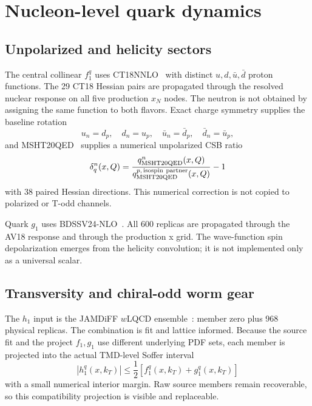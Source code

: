 \documentclass[11pt]{article}
\begin{document}
\section{Nucleon-level quark dynamics}
\label{sec:quarks}

\subsection{Unpolarized and helicity sectors}

The central collinear \(f_1^q\) uses CT18NNLO~\cite{CT18} with distinct
\(u,d,\bar u,\bar d\) proton functions.  The 29 CT18 Hessian pairs are
propagated through the resolved nuclear response on all five production
\(x_N\) nodes.  The neutron is not obtained by assigning the same function
to both flavors.  Exact charge symmetry supplies the baseline rotation
\begin{equation}
u_n=d_p,\quad d_n=u_p,\quad
\bar u_n=\bar d_p,\quad \bar d_n=\bar u_p,
\label{eq:charge-symmetry}
\end{equation}
and MSHT20QED~\cite{MSHTQED} supplies a numerical unpolarized CSB ratio
\begin{equation}
\delta_q^n(x,Q)=
\frac{q_{\rm MSHT20QED}^{n}(x,Q)}
     {q_{\rm MSHT20QED}^{p,\,{\rm isospin\ partner}}(x,Q)}-1
\label{eq:csb-ratio}
\end{equation}
with 38 paired Hessian directions.  This numerical correction is not copied
to polarized or T-odd channels.

Quark \(g_1\) uses BDSSV24-NLO~\cite{BDSSV24}.  All 600 replicas are propagated through
the AV18 response and through the production x grid.  The wave-function
spin depolarization emerges from the helicity convolution; it is not
implemented only as a universal scalar.

\subsection{Transversity and chiral-odd worm gear}

The \(h_1\) input is the JAMDiFF \(w\)LQCD ensemble~\cite{JAMDiff}:
member zero plus 968
physical replicas.  The combination is fit and lattice informed.  Because
the source fit and the project \(f_1,g_1\) use different underlying PDF
sets, each member is projected into the actual TMD-level Soffer interval
\begin{equation}
|h_1^q(x,k_T)|\leq
\frac12\left[f_1^q(x,k_T)+g_1^q(x,k_T)\right]
\label{eq:soffer}
\end{equation}
with a small numerical interior margin.  Raw source members remain
recoverable, so this compatibility projection is visible and replaceable.
\end{document}
